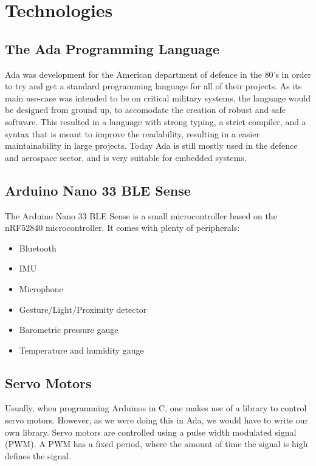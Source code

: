 \documentclass{article}
\begin{document}
\section{Technologies}

\subsection{The Ada Programming Language}
Ada was development for the American department of defence in the 80's in order to try and get a standard programming language for all of their projects. As its main use-case was intended to be on critical military systems, the language would be designed from ground up, to accomodate the creation of robust and safe software. This resulted in a language with strong typing, a strict compiler, and a syntax that is meant to improve the readability, resulting in a easier maintainability in large projects. Today Ada is still mostly used in the defence and aerospace sector, and is very suitable for embedded systems.\\


\subsection{Arduino Nano 33 BLE Sense}

The Arduino Nano 33 BLE Sense is a small microcontroller based on the nRF52840 microcontroller.
It comes with plenty of peripherals:
\begin{itemize}
  \item Bluetooth
  \item IMU
  \item Microphone
  \item Gesture/Light/Proximity detector
  \item Barometric pressure gauge
  \item Temperature and humidity gauge
\end{itemize}

\subsection{Servo Motors}
Usually, when programming Arduinos in C, one makes use of a library to control servo motors. However, as we were doing this in Ada, we would have to write our own library. Servo motors are controlled using a pulse width modulated signal (PWM). A PWM has a fixed period, where the amount of time the signal is high defines the signal. 
\end{document}
